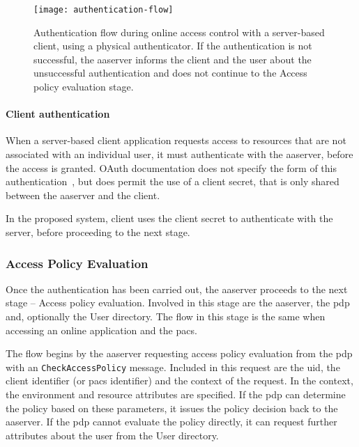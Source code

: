 \begin{sidewaysfigure}[p]
    \centering
    \texttt{[image: authentication-flow]}
    \caption{Authentication flow during online access control with a server-based client, using a physical authenticator. If the authentication is not successful, the \acrshort{aaserver} informs the client and the user about the unsuccessful authentication and does not continue to the Access policy evaluation stage.}
    \label{fig:authentication-flow}
\end{sidewaysfigure}

\paragraph{Client authentication}
When a server-based client application requests access to resources that are not associated with an individual user, it must authenticate with the \acrshort{aaserver}, before the access is granted. OAuth documentation does not specify the form of this authentication~\cite{Hardt2012TheFramework}, but does permit the use of a client secret, that is only shared between the \acrshort{aaserver} and the client.

In the proposed system, client uses the client secret to authenticate with the server, before proceeding to the next stage.

\subsubsection{Access Policy Evaluation}
Once the authentication has been carried out, the \acrshort{aaserver} proceeds to the next stage -- Access policy evaluation. Involved in this stage are the \acrshort{aaserver}, the \acrshort{pdp} and, optionally the User directory. The flow in this stage is the same when accessing an online application and the \acrshort{pacs}.

The flow begins by the \acrshort{aaserver} requesting access policy evaluation from the \acrshort{pdp} with an \texttt{CheckAccessPolicy} message. Included in this request are the \acrshort{uid}, the client identifier (or \acrshort{pacs} identifier) and the context of the request. In the context, the environment and resource attributes are specified. If the \acrshort{pdp} can determine the policy based on these parameters, it issues the policy decision back to the \acrshort{aaserver}. If the \acrshort{pdp} cannot evaluate the policy directly, it can request further attributes about the user from the User directory.

